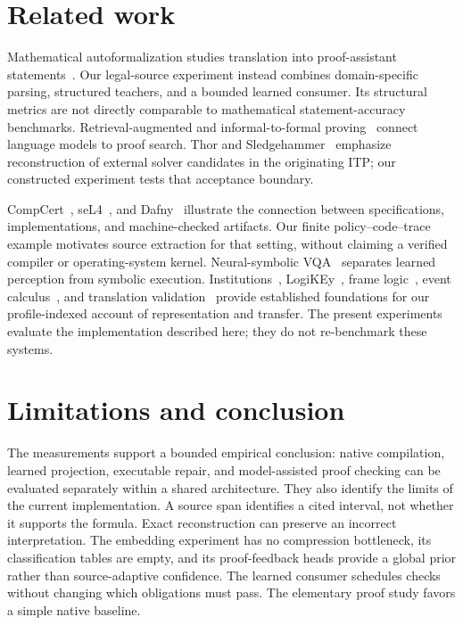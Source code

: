 \documentclass{article}
\begin{document}
\section{Related work}
Mathematical autoformalization studies translation into proof-assistant statements~\citep{wu2022autoformalization,azerbayev2023proofnet,jiang2024multilanguage}. Our legal-source experiment instead combines domain-specific parsing, structured teachers, and a bounded learned consumer. Its structural metrics are not directly comparable to mathematical statement-accuracy benchmarks. Retrieval-augmented and informal-to-formal proving~\citep{jiang2022thor,jiang2023dsp,yang2023leandojo,first2023baldur} connect language models to proof search. Thor and Sledgehammer~\citep{blanchette2013sledgehammer} emphasize reconstruction of external solver candidates in the originating ITP; our constructed experiment tests that acceptance boundary.

CompCert~\citep{leroy2009compcert}, seL4~\citep{klein2009sel4}, and Dafny~\citep{leino2010dafny} illustrate the connection between specifications, implementations, and machine-checked artifacts. Our finite policy--code--trace example motivates source extraction for that setting, without claiming a verified compiler or operating-system kernel. Neural-symbolic VQA~\citep{yi2018nsvqa} separates learned perception from symbolic execution. Institutions~\citep{goguen1992institutions}, LogiKEy~\citep{benzmuller2020logikey}, frame logic~\citep{kifer1995flogic}, event calculus~\citep{kowalski1986events}, and translation validation~\citep{pnueli1998translation} provide established foundations for our profile-indexed account of representation and transfer. The present experiments evaluate the implementation described here; they do not re-benchmark these systems.

\section{Limitations and conclusion}
The measurements support a bounded empirical conclusion: native compilation, learned projection, executable repair, and model-assisted proof checking can be evaluated separately within a shared architecture. They also identify the limits of the current implementation. A source span identifies a cited interval, not whether it supports the formula. Exact reconstruction can preserve an incorrect interpretation. The embedding experiment has no compression bottleneck, its classification tables are empty, and its proof-feedback heads provide a global prior rather than source-adaptive confidence. The learned consumer schedules checks without changing which obligations must pass. The elementary proof study favors a simple native baseline.
\end{document}
